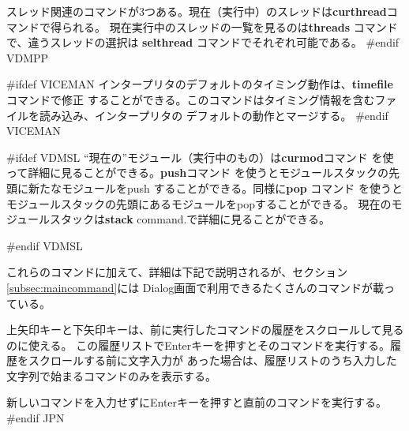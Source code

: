 \documentclass[\pformat,12pt]{article}
\newcommand{\guicmd}[1]{{\sf #1}}
\newcommand{\guicmd}[1]{{\gt #1}}
\begin{document}
スレッド関連のコマンドが3つある。現在（実行中）のスレッドは\textbf{curthread}コマンドで得られる。
現在実行中のスレッドの一覧を見るのは\textbf{threads} コマンドで、違うスレッドの選択は
\textbf{selthread} コマンドでそれぞれ可能である。
#endif VDMPP

#ifdef VICEMAN
インタープリタのデフォルトのタイミング動作は、\textbf{timefile} コマンドで修正
することができる。このコマンドはタイミング情報を含むファイルを読み込み、インタープリタの
デフォルトの動作とマージする。
#endif VICEMAN

#ifdef VDMSL
  ``現在の''モジュール（実行中のもの）は\textbf{curmod}コマンド 
  を使って詳細に見ることができる。\textbf{push}コマンド 
  を使うとモジュールスタックの先頭に新たなモジュールをpush
  することができる。同様に\textbf{pop} コマンド 
  を使うとモジュールスタックの先頭にあるモジュールをpopすることができる。
  現在のモジュールスタックは\textbf{stack} command.で詳細に見ることができる。
  
#endif VDMSL

これらのコマンドに加えて、詳細は下記で説明されるが、セクション\ref{subsec:maincommand}には
\guicmd{Dialog}画面で利用できるたくさんのコマンドが載っている。

上矢印キーと下矢印キーは、前に実行したコマンドの履歴をスクロールして見るのに使える。
この履歴リストでEnterキーを押すとそのコマンドを実行する。履歴をスクロールする前に文字入力が
あった場合は、履歴リストのうち入力した文字列で始まるコマンドのみを表示する。

新しいコマンドを入力せずにEnterキーを押すと直前のコマンドを実行する。
#endif JPN
\end{document}
